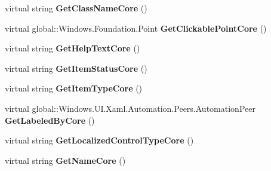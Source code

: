 \begin{DoxyCompactItemize}
virtual string {\bfseries Get\+Class\+Name\+Core} ()
\item 
\mbox{\label{class_windows_1_1_u_i_1_1_xaml_1_1_automation_1_1_peers_1_1_automation_peer_a08e12f22ea4a043975f822abaf961ce4}} 
virtual global\+::\+Windows.\+Foundation.\+Point {\bfseries Get\+Clickable\+Point\+Core} ()
\item 
\mbox{\label{class_windows_1_1_u_i_1_1_xaml_1_1_automation_1_1_peers_1_1_automation_peer_a7a8535136acdad3cca9f8c95a6ecc9e0}} 
virtual string {\bfseries Get\+Help\+Text\+Core} ()
\item 
\mbox{\label{class_windows_1_1_u_i_1_1_xaml_1_1_automation_1_1_peers_1_1_automation_peer_a7531b623b14754b9f333f073e787370c}} 
virtual string {\bfseries Get\+Item\+Status\+Core} ()
\item 
\mbox{\label{class_windows_1_1_u_i_1_1_xaml_1_1_automation_1_1_peers_1_1_automation_peer_ab7e73605b4d6af50ce1e8d3be13f718c}} 
virtual string {\bfseries Get\+Item\+Type\+Core} ()
\item 
\mbox{\label{class_windows_1_1_u_i_1_1_xaml_1_1_automation_1_1_peers_1_1_automation_peer_a7b381b450ce7bad769a25c534aecc3a7}} 
virtual global\+::\+Windows.\+U\+I.\+Xaml.\+Automation.\+Peers.\+Automation\+Peer {\bfseries Get\+Labeled\+By\+Core} ()
\item 
\mbox{\label{class_windows_1_1_u_i_1_1_xaml_1_1_automation_1_1_peers_1_1_automation_peer_a102feaeb60241a4b90e5215604402a40}} 
virtual string {\bfseries Get\+Localized\+Control\+Type\+Core} ()
\item 
\mbox{\label{class_windows_1_1_u_i_1_1_xaml_1_1_automation_1_1_peers_1_1_automation_peer_ab0c8c7ce6d1a49aca1d7cd572de76b25}} 
virtual string {\bfseries Get\+Name\+Core} ()

\end{DoxyCompactItemize}
